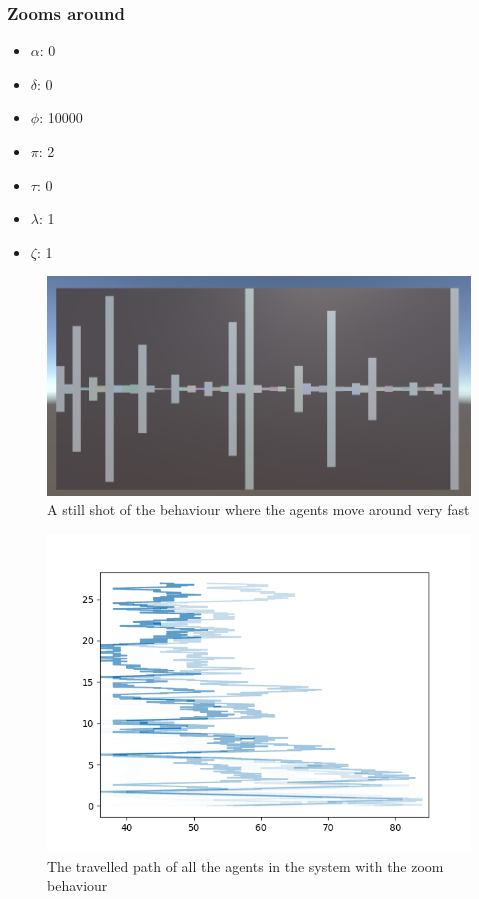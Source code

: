 \documentclass[a4paper,english]{report}
\begin{document}
	\subsubsection{Zooms around}
	\begin{samepage}\begin{itemize}
		\item $\alpha$: 0
		\item $\delta$: 0
		\item $\phi$: 10000
		\item $\pi$: 2
		\item $\tau$: 0
		\item $\lambda$: 1
		\item $\zeta$: 1
	\end{itemize}\end{samepage}
	\begin{figure}
		\centering
		\includegraphics[width=1\linewidth]{zoom_vis}
		\caption{A still shot of the behaviour where the agents move around very fast}
		\label{fig:zoom_vis}
	\end{figure}
	\begin{figure}
		\centering
		\includegraphics[width=1\linewidth]{zoom}
		\caption{The travelled path of all the agents in the system with the zoom behaviour}
		\label{fig:zoom}
	\end{figure}
\end{document}

